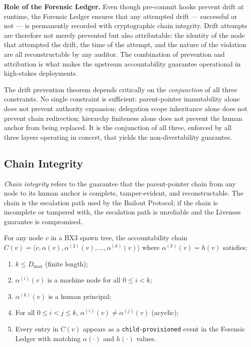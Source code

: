 \medskip
\noindent\textbf{Role of the Forensic Ledger.}  Even though pre-commit hooks
prevent drift at runtime, the Forensic Ledger ensures that any attempted drift —
successful or not — is permanently recorded with cryptographic chain integrity.
Drift attempts are therefore not merely prevented but also attributable: the
identity of the node that attempted the drift, the time of the attempt, and the
nature of the violation are all reconstructable by any auditor.  The combination
of prevention and attribution is what makes the upstream accountability guarantee
operational in high-stakes deployments.

The drift prevention theorem depends critically on the \textit{conjunction} of
all three constraints.  No single constraint is sufficient: parent-pointer
immutability alone does not prevent authority expansion; delegation scope
inheritance alone does not prevent chain redirection; hierarchy finiteness alone
does not prevent the human anchor from being replaced.  It is the conjunction of
all three, enforced by all three layers operating in concert, that yields the
non-divertability guarantee.

\subsection{Chain Integrity}
\label{sec:rs-chain-integrity}

\textit{Chain integrity} refers to the guarantee that the parent-pointer chain
from any node to its human anchor is complete, tamper-evident, and reconstructable.
The chain is the escalation path used by the Bailout Protocol; if the chain is
incomplete or tampered with, the escalation path is unreliable and the Liveness
guarantee is compromised.

\begin{property}
\label{prop:chain-integrity}
For any node $v$ in a BX3 spawn tree, the accountability chain
$C(v) = \langle v, \alpha(v), \alpha^{(2)}(v), \ldots, \alpha^{(k)}(v) \rangle$
where $\alpha^{(k)}(v) = h(v)$ satisfies:
\begin{enumerate}
\item $k \leq D_{\max}$ (finite length);
\item $\alpha^{(i)}(v)$ is a machine node for all $0 \leq i < k$;
\item $\alpha^{(k)}(v)$ is a human principal;
\item For all $0 \leq i < j \leq k$, $\alpha^{(i)}(v) \neq \alpha^{(j)}(v)$ (acyclic);
\item Every entry in $C(v)$ appears as a \texttt{child-provisioned} event in the
Forensic Ledger with matching $\alpha(\cdot)$ and $h(\cdot)$ values.
\end{enumerate}
\end{property}

